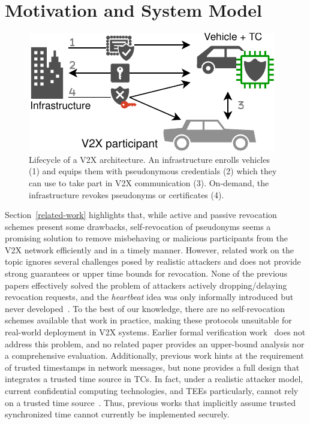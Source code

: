 \section{Motivation and System Model}
\label{chapter:system-model}

\begin{figure}[t]
  \centering
    \includegraphics[width=.9\columnwidth]{figures/drawio/requirements.drawio.pdf}
  \caption{Lifecycle of a \acs{V2X} architecture. An infrastructure enrolls vehicles (1) and equips them with pseudonymous credentials (2) which they can use to take part in V2X communication (3). On-demand, the infrastructure revokes pseudonyms or certificates (4).}
  \label{fig:system-model}
\end{figure}

Section~\ref{related-work} highlights that, while active and passive revocation
schemes present some drawbacks, self-revocation of pseudonyms seems a promising
solution to remove misbehaving or malicious participants from the \ac{V2X}
network efficiently and in a timely manner. However, related work on the topic
ignores several challenges posed by realistic attackers and does not provide
strong guarantees or upper time bounds for revocation. None of the previous
papers effectively solved the problem of attackers actively dropping/delaying
revocation requests, and the \emph{heartbeat} idea was only informally
introduced but never
developed~\cite{whitefield2017privacy,desmoulins2019practical,larsen2021daa}. To
the best of our knowledge, there are no self-revocation schemes available that
work in practice, making these protocols unsuitable for real-world deployment in
\ac{V2X} systems. Earlier formal verification work~\cite{whitefield2017formal}
does not address this problem, and no related paper provides an upper-bound
analysis nor a comprehensive evaluation. Additionally, previous work hints at
the requirement of trusted timestamps in network messages, but none provides a
full design that integrates a trusted time source in \acp{TC}. In fact, under a
realistic attacker model, current confidential computing technologies, and
\acp{TEE} particularly, cannot rely on a trusted time
source~\cite{alder2023about}. Thus, previous works that implicitly assume
trusted synchronized time cannot currently be implemented securely.

